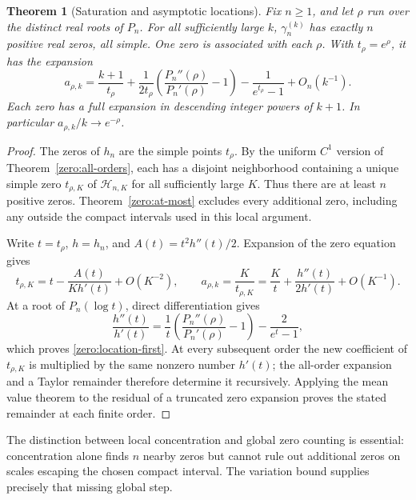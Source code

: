 \documentclass[11pt,a4paper]{article}
\newtheorem{theorem}{Theorem}[section]
\theoremstyle{definition}
\theoremstyle{remark}
\numberwithin{equation}{section}
\begin{document}
\begin{theorem}[Saturation and asymptotic locations]\label{zero:locations}
Fix $n\geq1$, and let $\rho$ run over the distinct real roots of $P_n$.
For all sufficiently large $k$, $\gamma_n^{(k)}$ has exactly $n$
positive real zeros, all simple.  One zero is associated with each
$\rho$.  With $t_\rho=e^\rho$, it has the expansion
\begin{equation}\label{zero:location-first}
 a_{\rho,k}=\frac{k+1}{t_\rho}
       +\frac{1}{2t_\rho}
           \left(\frac{P_n''(\rho)}{P_n'(\rho)}-1\right)
       -\frac1{e^{t_\rho}-1}+O_n(k^{-1}).
\end{equation}
Each zero has a full expansion in descending integer powers of $k+1$.
In particular $a_{\rho,k}/k\to e^{-\rho}$.
\end{theorem}
\begin{proof}
The zeros of $h_n$ are the simple points $t_\rho$.  By the uniform
$C^1$ version of Theorem~\ref{zero:all-orders}, each has a disjoint
neighborhood containing a unique simple zero $t_{\rho,K}$ of
$\mathcal H_{n,K}$ for all sufficiently large $K$.  Thus there are
at least $n$ positive zeros.  Theorem~\ref{zero:at-most} excludes
every additional zero, including any outside the compact intervals
used in this local argument.

Write $t=t_\rho$, $h=h_n$, and
$A(t)=t^2h''(t)/2$.  Expansion of the zero equation gives
\[
 t_{\rho,K}=t-\frac{A(t)}{K h'(t)}+O(K^{-2}),
 \qquad
 a_{\rho,k}=\frac K{t_{\rho,K}}
              =\frac Kt+\frac{h''(t)}{2h'(t)}+O(K^{-1}).
\]
At a root of $P_n(\log t)$, direct differentiation gives
\[
 \frac{h''(t)}{h'(t)}
  =\frac1t\left(\frac{P_n''(\rho)}{P_n'(\rho)}-1\right)
                           -\frac2{e^t-1},
\]
which proves \eqref{zero:location-first}.  At every subsequent order
the new coefficient of $t_{\rho,K}$ is multiplied by the same nonzero
number $h'(t)$; the all-order expansion and a Taylor remainder therefore
determine it recursively.  Applying the mean value theorem to the
residual of a truncated zero expansion proves the stated remainder at
each finite order.
\end{proof}

The distinction between local concentration and global zero counting is
essential: concentration alone finds $n$ nearby zeros but cannot rule
out additional zeros on scales escaping the chosen compact interval.
The variation bound supplies precisely that missing global step.
\end{document}
